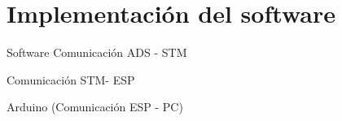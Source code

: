 \chapter{Implementación del software\label{sec:Implementacion_soft}}


Software
	Comunicación ADS - STM
	
	Comunicación STM- ESP
	
	Arduino (Comunicación ESP - PC)
	
	